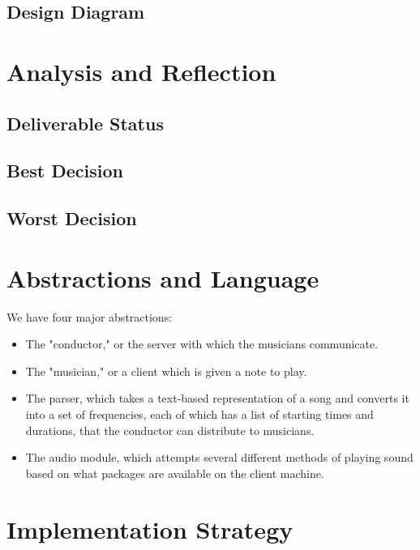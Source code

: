 \documentclass[12pt, letterpaper]{article}
\begin{document}
\subsection{Design Diagram}



\section{Analysis and Reflection}

\subsection{Deliverable Status}

\subsection{Best Decision}

\subsection{Worst Decision}


\section{Abstractions and Language}
We have four major abstractions:

\begin{itemize}
\item The "conductor," or the server with which the musicians communicate.
\item The "musician," or a client which is given a note to play.
\item The parser, which takes a text-based representation of a song and converts it into a set of frequencies, each of which has a list of starting times and durations, that the conductor can distribute to musicians.
\item The audio module, which attempts several different methods of playing sound based on what packages are available on the client machine.
\end{itemize}



\section{Implementation Strategy}
\end{document}
